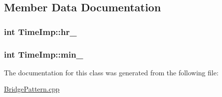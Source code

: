 \subsection{Member Data Documentation}
\subsubsection[{\texorpdfstring{hr\+\_\+}{hr_}}]{\setlength{\rightskip}{0pt plus 5cm}int Time\+Imp\+::hr\+\_\+\hspace{0.3cm}{\ttfamily [protected]}}\hypertarget{classTimeImp_aa4d75bb67cdab3e797171e78996ac551}{}\label{classTimeImp_aa4d75bb67cdab3e797171e78996ac551}
\subsubsection[{\texorpdfstring{min\+\_\+}{min_}}]{\setlength{\rightskip}{0pt plus 5cm}int Time\+Imp\+::min\+\_\+\hspace{0.3cm}{\ttfamily [protected]}}\hypertarget{classTimeImp_a72b908ae45367b24517a769ec9bb613f}{}\label{classTimeImp_a72b908ae45367b24517a769ec9bb613f}


The documentation for this class was generated from the following file\+:\begin{DoxyCompactItemize}
\item 
\hyperlink{BridgePattern_8cpp}{Bridge\+Pattern.\+cpp}\end{DoxyCompactItemize}
